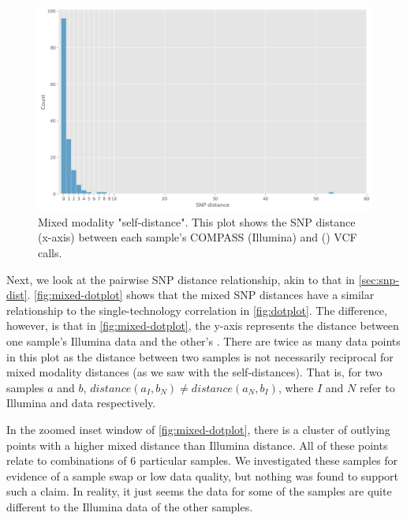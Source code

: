 \begin{figure}
\begin{center}
\includegraphics[width=0.90\columnwidth]{Chapter2/Figs/mixed_self_dist.png}
\caption{{Mixed modality "self-distance". This plot shows the SNP distance (x-axis) between each sample's COMPASS (Illumina) and \bcftools{} (\ont{}) VCF calls.
\label{fig:self-dist}
}}
\end{center}
\end{figure}

\noindent
Next, we look at the pairwise SNP distance relationship, akin to that in \autoref{sec:snp-dist}. \autoref{fig:mixed-dotplot} shows that the mixed SNP distances have a similar relationship to the single-technology correlation in \autoref{fig:dotplot}. The difference, however, is that in \autoref{fig:mixed-dotplot}, the y-axis represents the distance between one sample's Illumina data and the other's \ont{}. There are twice as many data points in this plot as the distance between two samples is not necessarily reciprocal for mixed modality distances (as we saw with the self-distances). That is, for two samples $a$ and $b$, $distance(a_I,b_N) \neq distance(a_N, b_I)$, where $I$ and $N$ refer to Illumina and \ont{} data respectively. 

In the zoomed inset window of \autoref{fig:mixed-dotplot}, there is a cluster of outlying points with a higher mixed distance than Illumina distance. All of these points relate to combinations of 6 particular samples. We investigated these samples for evidence of a sample swap or low data quality, but nothing was found to support such a claim. In reality, it just seems the \ont{} data for some of the samples are quite different to the Illumina data of the other samples.

